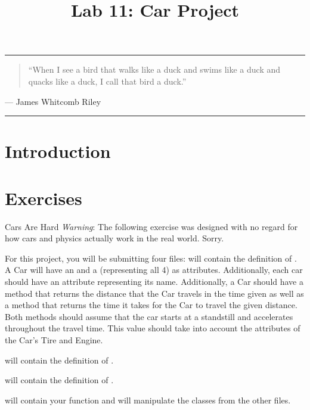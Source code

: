 \documentclass[11pt]{cselabheader}
\title{Lab 11: Car Project}
\begin{document}
\maketitle

\hrule
\begin{quotation}
  ``When I see a bird that walks like a duck and swims like a duck and quacks like
  a duck, I call that bird a duck.''
\end{quotation}
\begin{flushright}
  --- James Whitcomb Riley
\end{flushright}

\hrule

\section{Introduction}


\clearpage
\section{Exercises}
\label{sec:ex}

\begin{warningbox}{Cars Are Hard}
  \emph{Warning}: The following exercise was designed with no regard for how cars and
  physics actually work in the real world. Sorry.
\end{warningbox}

\begin{ex}
  For this project, you will be submitting four files:
   will contain the definition of . A
  Car will have an  and a   (representing all 4)
  as attributes. Additionally, each car should have an attribute representing its name.
  Additionally, a Car should have a method  that returns
  the distance that the Car travels in the time given as well as a method
   that returns the time it takes for the Car to travel
  the given distance.
  Both methods should assume that
  the car starts at a standstill and accelerates throughout the travel time. This value
  should take into account the attributes of the Car's Tire and Engine.
  
   will contain the definition of .
  
   will contain the definition of .

   will contain your  function and will
  manipulate the classes from the other files.
\end{ex}
\end{document}
